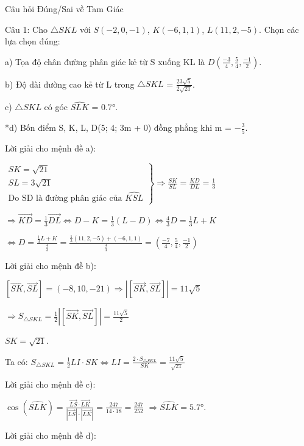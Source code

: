 \documentclass[a4paper,12pt]{article}
\begin{document}
Câu hỏi Đúng/Sai về Tam Giác

Câu 1: Cho \( \triangle SKL \) với \( S(-2, 0, -1) \), \( K(-6, 1, 1) \), \( L(11, 2, -5) \). Chọn các lựa chọn đúng:

a) Tọa độ chân đường phân giác kẻ từ S xuống KL là \( D(\frac{-3}{4}, \frac{5}{4}, \frac{-1}{2}) \).

b) Độ dài đường cao kẻ từ L trong \( \triangle SKL \) = \( \frac{23\sqrt{5}}{2\sqrt{21}} \).

c) \( \triangle SKL \) có góc \( \widehat{SLK} \) = \( 0.7° \).

*d) Bốn điểm S, K, L, D(5; 4; 3m + 0) đồng phẳng khi m = \(-\frac{3}{5}\).

Lời giải cho mệnh đề a):

\(\left. \begin{array}{l}
SK = \sqrt{21} \\
SL = 3\sqrt{21} \\
\text{Do SD là đường phân giác của } \widehat{KSL}
\end{array} \right\} \Rightarrow \frac{SK}{SL} = \frac{KD}{DL} = \frac{1}{3}\)

\(\Rightarrow \overrightarrow{KD} = \frac{1}{3}\overrightarrow{DL} \Leftrightarrow D - K = \frac{1}{3}(L - D) \Leftrightarrow \frac{4}{3}D = \frac{1}{3}L + K\)

\(\Leftrightarrow D = \frac{\frac{1}{3}L + K}{\frac{4}{3}} = \frac{\frac{1}{3}(11, 2, -5) + (-6, 1, 1)}{\frac{4}{3}} = (\frac{-7}{4}, \frac{5}{4}, \frac{-1}{2})\)

Lời giải cho mệnh đề b):

\([\overrightarrow{SK}, \overrightarrow{SL}] = (-8, 10, -21) \Rightarrow |[\overrightarrow{SK}, \overrightarrow{SL}]| = 11\sqrt{5}\)

\(\Rightarrow S_{\triangle SKL} = \frac{1}{2} |[\overrightarrow{SK}, \overrightarrow{SL}]| = \frac{11\sqrt{5}}{2}\)

\(SK = \sqrt{21}\).

Ta có: \({}S_{\triangle SKL} = \frac{1}{2} LI \cdot SK \Leftrightarrow LI = \frac{2 \cdot S_{\triangle SKL}}{SK} = \frac{11\sqrt{5}}{\sqrt{21}}\)

Lời giải cho mệnh đề c):

\( \cos(\widehat{SLK}) = \frac{\overrightarrow{LS} \cdot \overrightarrow{LK}}{|\overrightarrow{LS}| \cdot |\overrightarrow{LK}|} = \frac{247}{14 \cdot 18} = \frac{247}{252} \) \( \Rightarrow \widehat{SLK} = 5.7° \).

Lời giải cho mệnh đề d):
\end{document}
